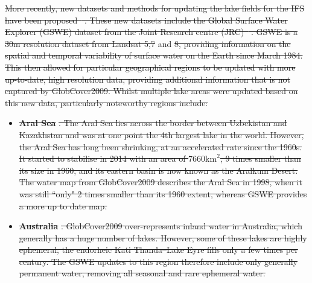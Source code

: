 \documentclass[hess, twostagejnl]{copernicus}
\providecommand{\DIFdel}[1]{{\protect\color{red}\sout{#1}}}                      %
\providecommand{\DIFdelbegin}{} %
\providecommand{\DIFdelend}{} %
\begin{document}
\DIFdel{More recently, new datasets and methods for updating the lake fields for the IFS have been proposed\mbox{%
\cite{Choulga2019}}\hskip0pt%
. These new datasets include the Global Surface Water Explorer (GSWE) dataset from the Joint Research centre (JRC)\mbox{%
\cite{GSWE}}\hskip0pt%
. GSWE is a 30m resolution dataset from Landsat 5,7 }\DIFdelend and \DIFdelbegin \DIFdel{8, providing  information on the spatial and temporal variability of surface water on the Earth since March 1984. This then allowed for particular geographical regions to be updated with more up-to-date, high resolution data, providing additional information that is not captured by GlobCover2009. Whilst multiple lake areas were updated based on this new data, particularly noteworthy regions include:
}%
\begin{itemize}%
\item%
\textbf{\DIFdel{Aral Sea}}%
\DIFdel{. The Aral Sea lies across the border between Uzbekistan and Kazakhstan and was at one point the 4th largest lake in the world. However, the Aral Sea has long been shrinking, at an accelerated rate since the 1960s. It started to stabilise in 2014 with an area of $7660 \text{km}^2$, 9 times smaller than its size in 1960, and its eastern basin is now known as the Aralkum Desert. The water map from GlobCover2009 describes the Aral Sea in 1998, when it was still ``only" 2 times smaller than its 1960 extent, whereas GSWE provides a more up to date map. }%
\item%
\textbf{\DIFdel{Australia}}%
\DIFdel{. GlobCover2009 over-represents inland water in Australia, which generally has a huge number of lakes. However, some of these lakes are highly ephemeral;  the endorheic Kati Thanda–Lake Eyre fills only a few times per century. The GSWE updates to this region therefore include only generally permanent water, removing all seasonal and rare ephemeral water. 
}
\end{itemize}%
\end{document}

